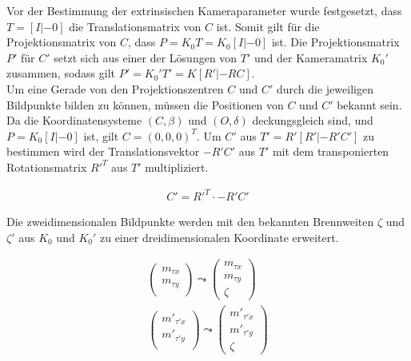 

Vor der Bestimmung der extrinsischen Kameraparameter wurde festgesetzt, dass $T = [I|-0]$ die Translationsmatrix von $C$ ist. Somit gilt für die Projektionsmatrix von $C$, dass $P= K_0T =K_0[I|-0]$ ist. Die Projektionsmatrix $P'$ für $C'$ setzt sich aus einer der Lösungen von $T'$ und der Kameramatrix $K_0'$ zusammen, sodass gilt $P'=K_0'T' = K[R'|-RC]$.\\

Um eine Gerade von den Projektionszentren $C$ und $C'$ durch die jeweiligen Bildpunkte bilden zu können, müssen die Positionen von $C$ und $C'$ bekannt sein. Da die Koordinatensysteme $(C,\beta)$ und $(O,\delta)$ deckungsgleich sind, und $P = K_0[I|-0]$ ist, gilt $C = (0,0,0)^T$.  Um $C'$ aus $T' = R'[R'|-R'C']$ zu bestimmen wird der Translationsvektor $-R'C'$ aus $T'$ mit dem transponierten Rotationsmatrix $R'^T$ aus $T'$ multipliziert.

\begin{gather}
	C' =  R'^T \cdot -R'C' 
\end{gather}

%

Die zweidimensionalen Bildpunkte werden mit den bekannten Brennweiten $\zeta$ und $\zeta'$ aus $K_0$ und $K_0'$ zu einer dreidimensionalen Koordinate erweitert.

\begin{gather}
	\begin{pmatrix}
	m_{\tau x}\\
	m_{\tau y}\\
	\end{pmatrix} \leadsto 
		\begin{pmatrix}
	m_{\tau x} \\
	m_{\tau y}\\
	\zeta
	\end{pmatrix}\\
		\begin{pmatrix}
	m'_{\tau' x}\\
	m'_{\tau' y}\\
	\end{pmatrix} \leadsto 
	\begin{pmatrix}
	m'_{\tau' x} \\
	m'_{\tau' y}\\
	\zeta
	\end{pmatrix}	
\end{gather}

